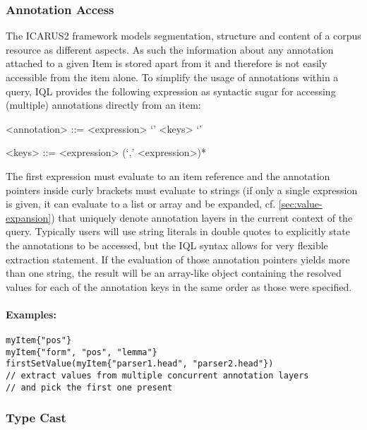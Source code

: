 \documentclass[11pt]{article}
\newcommand{\iql}{IQL\xspace}
\begin{document}
\subsubsection{Annotation Access}
\label{sec:annotation-access}

The ICARUS2 framework models segmentation, structure and content of a corpus resource as different aspects. As such the information about any annotation attached to a given Item is stored apart from it and therefore is not easily accessible from the item alone. To simplify the usage of annotations within a query, \iql provides the following expression as syntactic sugar for accessing (multiple) annotations directly from an item:

\begin{grammar}	
	<annotation> ::= <expression> `{' <keys> `}'
	
	<keys> ::= <expression> (`,' <expression>)*
\end{grammar}

\noindent The first expression must evaluate to an item reference and the annotation pointers inside curly brackets must evaluate to strings (if only a single expression is given, it can evaluate to a list or array and be expanded, cf. \cref{sec:value-expansion}) that uniquely denote annotation layers in the current context of the query. Typically users will use string literals in double quotes to explicitly state the annotations to be accessed, but the \iql syntax allows for very flexible extraction statement. If the evaluation of those annotation pointers yields more than one string, the result will be an array-like object containing the resolved values for each of the annotation keys in the same order as those were specified.

\paragraph{Examples:}

\begin{verbatim}
myItem{"pos"}
myItem{"form", "pos", "lemma"}
firstSetValue(myItem{"parser1.head", "parser2.head"})   
// extract values from multiple concurrent annotation layers
// and pick the first one present
\end{verbatim}

\subsubsection{Type Cast}
\label{sec:type-cast}
\end{document}
